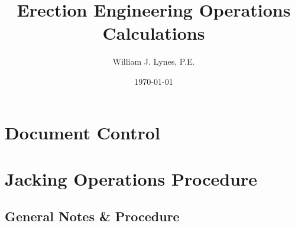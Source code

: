 \documentclass[11pt,letterpaper]{report}
\author{William J. Lynes, P.E.}
\title{Erection Engineering Operations Calculations}
\date{\today}
\begin{document}
 

\setcounter{page}{1}
\tableofcontents

\newpage

\newcommand\zzz[1]{%
\vspace*{\fill}
{\centering\fontsize{24pt}{24pt}\bfseries#1\par}
\vspace*{\fill}
\clearpage}
\titleformat{\chapter}{\zzz}{}{1em}{}


\newcommand\yyy[1]{%
\clearpage
\vspace*{\fill}
{\centering\fontsize{18pt}{18pt}\bfseries#1\par}
\vspace*{\fill}
\clearpage}
\titleformat{\section}{\yyy}{}{1em}{}

\newcommand\aaa[1]{%
\clearpage
\vspace*{\fill}
{\centering\fontsize{14pt}{14pt}\bfseries#1\par}
\vspace*{\fill}
\clearpage}
\titleformat{\subsection}{\aaa}{}{1em}{}





\renewcommand{\thechapter}{}
\chapter{Document Control}

\setcounter{page}{1}
\renewcommand{\thepage}{}
\renewcommand{\thechapter}{\arabic{chapter}}
\setcounter{chapter}{0}
\chapter{Jacking Operations Procedure}
\setcounter{page}{1}
\renewcommand{\thepage}{\arabic{chapter}-\arabic{page}}
\section{General Notes \& Procedure}
 
\end{document}
